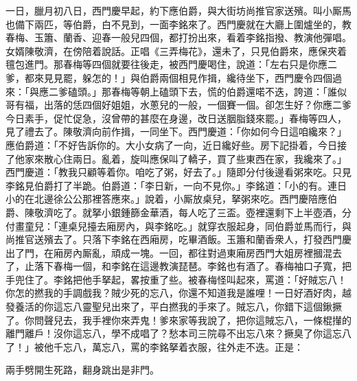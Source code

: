 一日，臘月初八日，西門慶早起，約下應伯爵，與大街坊尚推官家送殯。叫小厮馬也備下兩匹，等伯爵，白不見到，一面李銘來了。西門慶就在大廳上圍爐坐的，教春梅、玉簫、蘭香、迎春一般兒四個，都打扮出來，看着李銘指撥、教演他彈唱。女婿陳敬濟，在傍陪着說話。正唱《三弄梅花》，還未了，只見伯爵來，應保夾着氊包進門。那春梅等四個就要往後走，被西門慶喝住，說道：「左右只是你應二爹，都來見見罷，躲怎的！」與伯爵兩個相見作揖，纔待坐下，西門慶令四個過來：「與應二爹磕頭。」那春梅等朝上磕頭下去，慌的伯爵還喏不迭，誇道：「誰似哥有福，出落的恁四個好姐姐，水蔥兒的一般，一個賽一個。卻怎生好？你應二爹今日素手，促忙促急，沒曾帶的甚麼在身邊，改日送胭脂錢來罷。」春梅等四人，見了禮去了。陳敬濟向前作揖，一同坐下。西門慶道：「你如何今日這咱纔來？」應伯爵道：「不好告訴你的。大小女病了一向，近日纔好些。房下記掛着，今日接了他家來散心住兩日。亂着，旋叫應保叫了轎子，買了些東西在家，我纔來了。」{}西門慶道：「教我只顧等着你。咱吃了粥，好去了。」隨即分付後邊看粥來吃。只見李銘見伯爵打了半跪。伯爵道：「李日新，一向不見你。」李銘道：「小的有。連日小的在北邊徐公公那裡答應來。」說着，小厮放桌兒，拏粥來吃。西門慶陪應伯爵、陳敬濟吃了。就拏小銀鍾篩金華酒，每人吃了三盃。壺裡還剩下上半壺酒，分付畫童兒：「連桌兒擡去廂房內，與李銘吃。」{}就穿衣服起身，同伯爵並馬而行，與尚推官送殯去了。只落下李銘在西廂房，吃畢酒飯。玉簫和蘭香衆人，打發西門慶出了門，在廂房內厮亂，頑成一塊。{}一回，都往對過東廂房西門大姐房裡摑混去了，止落下春梅一個，和李銘在這邊教演琵琶。李銘也有酒了。春梅袖口子寬，把手兜住了。李銘把他手拏起，畧按重了些。被春梅怪叫起來，{}罵道：「好賊忘八！你怎的撚我的手調戲我？賊少死的忘八，你還不知道我是誰哩！{}一日好酒好肉，越發養活的你這忘八靈聖兒出來了，{}平白撚我的手來了。賊忘八，你錯下這個鍬撅了。你問聲兒去，我手裡你來弄鬼！爹來家等我說了，把你這賊忘八，一條棍攆的離門離戶！沒你這忘八，學不成唱了？愁本司三院尋不出忘八來？撅臭了你這忘八了！」被他千忘八，萬忘八，罵的李銘拏着衣服，往外走不迭。正是：

\begin{myquote} 
兩手劈開生死路，翻身跳出是非門。
\end{myquote} 


